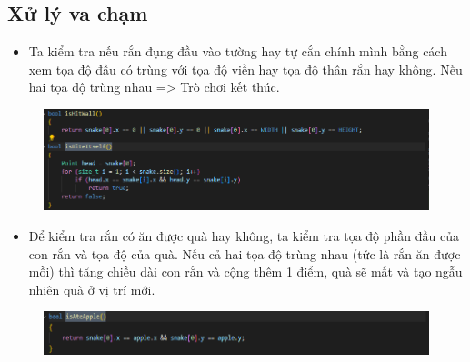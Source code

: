 \documentclass[../main-report.tex]{subfiles}
\begin{document}
\subsection{Xử lý va chạm}
\begin{itemize}
    \item Ta kiểm tra nếu rắn đụng đầu vào tường hay tự cắn chính mình bằng cách xem tọa độ đầu có trùng với tọa độ viền hay tọa độ thân rắn hay không. Nếu hai tọa độ trùng nhau => Trò chơi kết thúc.
\end{itemize}
\begin{figure}[ht]
    \centering
    \includegraphics[scale=0.6]{chapters/hinh/snake2.png}
\end{figure}
\begin{itemize}
    \item Để kiểm tra rắn có ăn được quà hay không, ta kiểm tra tọa độ phần đầu của con
rắn và tọa độ của quà. Nếu cả hai tọa độ trùng nhau (tức là rắn ăn được mồi) thì tăng chiều dài con rắn và cộng thêm 1 điểm, quà sẽ mất và tạo ngẫu nhiên quà ở vị trí mới.
\end{itemize}
\begin{figure}[ht]
    \centering
    \includegraphics[scale=0.6]{chapters/hinh/snake3.png}
\end{figure}
\end{document}

